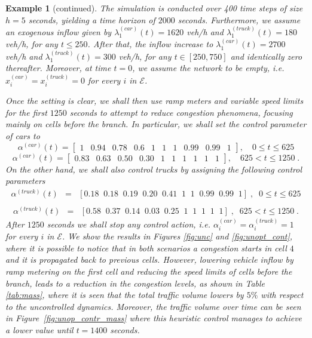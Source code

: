 \documentclass[preprint,12pt]{elsarticle}
\newtheorem{example}{Example}
\newcommand{\ben}{\begin{equation*}}
\newcommand{\een}{\end{equation*}}
\newcommand{\mc}{\mathcal}
\newcommand{\ba}{\begin{array}}
\newcommand{\ea}{\end{array}}
\newenvironment{contexample}{
	\addtocounter{example}{-1} \begin{example}[continued]}{
	\end{example}\addtocounter{example}{0}}
\begin{document}
\begin{contexample}
	The simulation is conducted over 400 time steps of size $h = 5 $ seconds, yielding a time horizon of $2000$ seconds. Furthermore, we assume an exogenous inflow given by $\lambda_1^{(car)}(t) = 1620$ veh/h and $\lambda_1^{(truck)}(t) = 180$ veh/h, for any $t \leq 250$. After that, the inflow increase to $\lambda_1^{(car)}(t) = 2700$ veh/h and $\lambda_1^{(truck)}(t) = 300$ veh/h, for any $t \in [250,750]$ and identically zero thereafter. Moreover, at time $t = 0$, we assume the network to be empty, i.e. $x_i^{(car)} = x_i^{(truck)} = 0$ for every $i$ in $\mc{E}$. 

    Once the setting is clear, we shall then use ramp meters and variable speed limits for the first $1250$ seconds to attempt to reduce congestion phenomena, focusing mainly on cells before the branch. In particular, we shall set the control parameter of cars to 
\[
\alpha^{(car)}(t) =
\begin{bmatrix}
1 & 0.94 & 0.78 & 0.6 & 1 & 1 & 1 & 0.99 & 0.99 & 1
\end{bmatrix}, \quad 0 \le t \le 625
\]
\[
\alpha^{(car)}(t) =
\begin{bmatrix}
0.83 & 0.63 & 0.50 & 0.30 & 1 & 1 & 1 & 1 & 1 & 1
\end{bmatrix}, \quad 625 < t \le 1250\;.
\]
On the other hand, we shall also control trucks by assigning the following control parameters
\ben
\ba{rcl}
\alpha^{(truck)}(t) & = & \left[0.18 \;\; 0.18 \;\; 0.19 \;\; 0.20 \;\; 0.41 \;\; 1 \;\; 1 \;\; 0.99 \;\; 0.99 \;\; 1\right]\;, \;\;  0 \leq t \leq 625 \\
\ea 
\een
\ben
\ba{rcl}
\alpha^{(truck)}(t) & = & \left[ 
0.58 \;\; 0.37 \;\; 0.14 \;\; 0.03 \;\; 0.25 \;\; 1 \;\; 1 \;\; 1 \;\; 1 \;\; 1
\right]\;, \;\; 625 < t \le 1250\;.
\ea
\een
After $1250$ seconds we shall stop any control action, i.e. $\alpha_i^{(car)} = \alpha_i^{(truck)} = 1$ for every $i$ in $\mc{E}$. We show the results in Figures \ref{fig:unc} and \ref{fig:unopt_cont}, where it is possible to notice that in both scenarios a congestion starts in cell $4$ and it is propagated back to previous cells. However, lowering vehicle inflow by ramp metering on the first cell and reducing the speed limits of cells before the branch, leads to a reduction in the congestion levels, as shown in Table \ref{tab:mass}, where it is seen that the total traffic volume lowers by $5\%$ with respect to the uncontrolled dynamics. Moreover, the traffic volume over time can be seen in Figure~\ref{fig:unop_contr_mass} where this heuristic control manages to achieve a lower value until $t = 1400 $ seconds.

\end{contexample}
\end{document}
